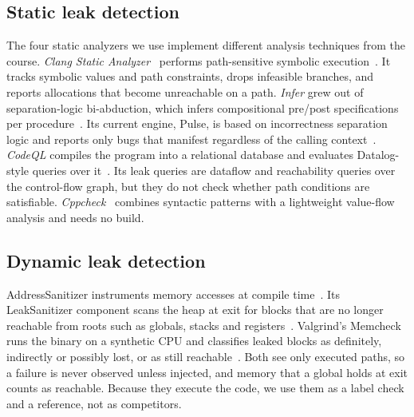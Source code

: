 \subsection{Static leak detection}
The four static analyzers we use implement different analysis techniques from the course.
\emph{Clang Static Analyzer}~\cite{clangsa} performs path-sensitive symbolic execution~\cite{king1976symbolic}.
It tracks symbolic values and path constraints, drops infeasible branches, and reports allocations that become unreachable on a path.
\emph{Infer} grew out of separation-logic bi-abduction, which infers compositional pre/post specifications per procedure~\cite{calcagno2009biabduction}.
Its current engine, Pulse, is based on incorrectness separation logic and reports only bugs that manifest regardless of the calling context~\cite{le2022pulse,inferpulse}.
\emph{CodeQL} compiles the program into a relational database and evaluates Datalog-style queries over it~\cite{avgustinov2016ql,codeqldocs}.
Its leak queries are dataflow and reachability queries over the control-flow graph, but they do not check whether path conditions are satisfiable.
\emph{Cppcheck}~\cite{cppcheck} combines syntactic patterns with a lightweight value-flow analysis and needs no build.

\subsection{Dynamic leak detection}
\label{sec:bg-dyn}
AddressSanitizer instruments memory accesses at compile time~\cite{serebryany2012asan}.
Its LeakSanitizer component scans the heap at exit for blocks that are no longer reachable from roots such as globals, stacks and registers~\cite{lsan}.
Valgrind's Memcheck runs the binary on a synthetic CPU and classifies leaked blocks as definitely, indirectly or possibly lost, or as still reachable~\cite{nethercote2007valgrind,valgrindmanual}.
Both see only executed paths, so a  failure is never observed unless injected, and memory that a global holds at exit counts as reachable.
Because they execute the code, we use them as a label check and a reference, not as competitors.

